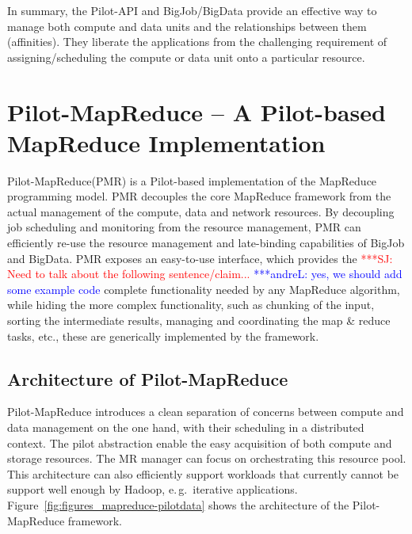 \documentclass{acm_proc_article-sp}
\newcommand{\jhanote}[1]{ {\textcolor{red} { ***SJ: #1 }}}
\newcommand{\alnote}[1]{ {\textcolor{blue} { ***andreL: #1 }}}
\newcommand{\alnote}[1]{}
\newcommand{\jhanote}[1]{}
\newcommand{\upp}{\vspace*{-0.5em}}
\newcommand{\pilot}{Pilot\xspace}
\newcommand{\pilotmapreduce}{Pilot-MapReduce\xspace}
\begin{document}

In summary, the Pilot-API and BigJob/BigData provide an effective way to manage both
compute and data units and the relationships between them
(affinities). They liberate the applications from the challenging
requirement of assigning/scheduling the compute or data unit onto a
particular resource.


\upp
\section{Pilot-MapReduce -- A Pilot-based MapReduce Implementation}
\label{sec-pilot-mr}

  

\pilotmapreduce (PMR) is a \pilot-based implementation of the
MapReduce programming model. PMR decouples the core MapReduce
framework from the actual management of the compute, data and network
resources. By decoupling job scheduling and monitoring from the
resource management, PMR can efficiently re-use the resource
management and late-binding capabilities of BigJob and BigData. PMR
exposes an easy-to-use interface, which provides the \jhanote{Need to
  talk about the following sentence/claim...} \alnote{yes, we should
  add some example code} complete functionality needed by any
MapReduce algorithm, while hiding the more complex functionality, such
as chunking of the input, sorting the intermediate results, managing
and coordinating the map \& reduce tasks, etc., these are generically
implemented by the framework.





\upp
\subsection{Architecture of \pilotmapreduce}
\pilotmapreduce introduces a clean separation of concerns between
compute and data management on the one hand, with their scheduling in
a distributed context. The pilot abstraction enable the easy
acquisition of both compute and storage resources. The MR manager can
focus on orchestrating this resource pool. This architecture can also
efficiently support workloads that currently cannot be support well
enough by Hadoop, e.\,g.\ iterative
applications. Figure~\ref{fig:figures_mapreduce-pilotdata} shows the
architecture of the \pilotmapreduce framework.
\end{document}
